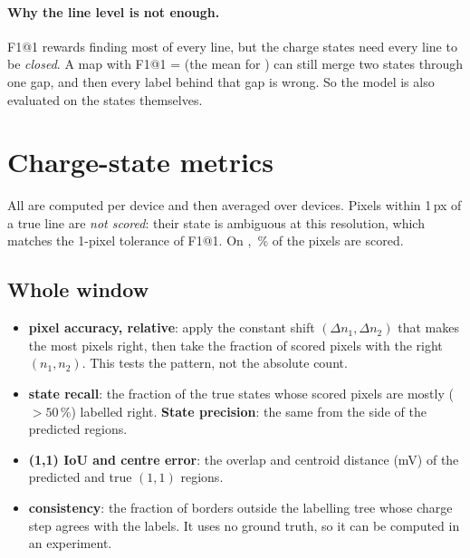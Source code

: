 \documentclass[10pt,a4paper]{article}
\begin{document}
\begin{table}[H]
\centering
\caption{Line-level metrics on the test devices, every U-Net of the sweep,
recomputed from the checkpoints the charge-state study used.  Means over
devices.}
\small
\resizebox{\textwidth}{!}{}
\end{table}

\paragraph{Why the line level is not enough.}  F1@1 rewards finding most of
every line, but the charge states need every line to be \emph{closed}.  A
map with F1@1 = \vMeFone{} (the mean for \vBud) can still merge two states
through one gap, and then every label behind that gap is wrong.  So the
model is also evaluated on the states themselves.

\section{Charge-state metrics}

All are computed per device and then averaged over devices.  Pixels within
1\,px of a true line are \emph{not scored}: their state is ambiguous at this
resolution, which matches the 1-pixel tolerance of F1@1.  On \vDevice,
\vDevScored\,\% of the pixels are scored.

\subsection*{Whole window}
\begin{itemize}
\item \textbf{pixel accuracy, relative}: apply the constant shift
  $(\Delta n_1,\Delta n_2)$ that makes the most pixels right, then take the
  fraction of scored pixels with the right $(n_1,n_2)$.  This tests the
  pattern, not the absolute count.
\item \textbf{state recall}: the fraction of the true states whose scored
  pixels are mostly ($>50\,\%$) labelled right.  \textbf{State precision}:
  the same from the side of the predicted regions.
\item \textbf{(1,1) IoU and centre error}: the overlap and centroid distance
  (mV) of the predicted and true $(1,1)$ regions.
\item \textbf{consistency}: the fraction of borders outside the labelling
  tree whose charge step agrees with the labels.  It uses no ground truth,
  so it can be computed in an experiment.
\end{itemize}
\end{document}
